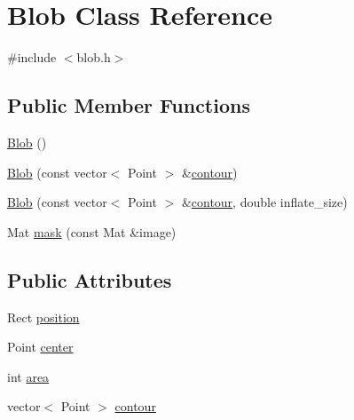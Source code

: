 \hypertarget{class_blob}{
\section{Blob Class Reference}
\label{class_blob}
}


{\ttfamily \#include $<$blob.h$>$}

\subsection*{Public Member Functions}
\begin{DoxyCompactItemize}
\item 
\hyperlink{class_blob_a6a0d29e3183e1458d1b9e6a5ca584826}{Blob} ()
\item 
\hyperlink{class_blob_a3b184a0014375ffe79cabc2acf385b36}{Blob} (const vector$<$ Point $>$ \&\hyperlink{common_8h_abe4c0d81732355b653509ed36e889160}{contour})
\item 
\hyperlink{class_blob_a9149d5db7849d239af4b3c6924edc1c5}{Blob} (const vector$<$ Point $>$ \&\hyperlink{common_8h_abe4c0d81732355b653509ed36e889160}{contour}, double inflate\_\-size)
\item 
Mat \hyperlink{class_blob_ac74da7a8b3e5daa1074a22ee02c77d16}{mask} (const Mat \&image)
\end{DoxyCompactItemize}
\subsection*{Public Attributes}
\begin{DoxyCompactItemize}
\item 
Rect \hyperlink{class_blob_a3b0e9ce257ffc2df3d7ba41a863c2c10}{position}
\item 
Point \hyperlink{class_blob_a55f346db1ac5b462f4f21837fa684131}{center}
\item 
int \hyperlink{class_blob_ab4518ab5ca61c304ea4bc2cdb9caa32f}{area}
\item 
vector$<$ Point $>$ \hyperlink{class_blob_a605d60a2ed8812901ede80e75822ce34}{contour}
\end{DoxyCompactItemize}


